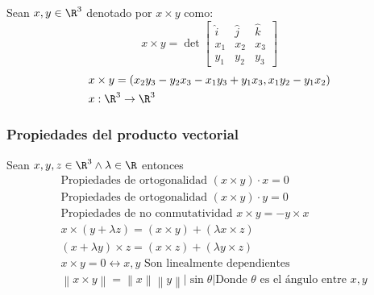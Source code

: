 \begin{definition}
	Sean $x,y \in \R^3$  denotado por $x\times y$ como:
	\begin{equation}
		x\times y=\det\begin{bmatrix}
			\hat{i} & \hat{j} & \hat{k} \\
			x_1     & x_2     & x_3     \\
			y_1     & y_2     & y_3
		\end{bmatrix}
	\end{equation}
	\begin{align}
		 & x\times y=\left( x_2y_3-y_2x_3-x_1y_3+y_1x_3,x_1y_2-y_1x_2 \right) \\
		 & x:\R^3\to \R^3
	\end{align}
\end{definition}

\subsubsection{Propiedades del producto vectorial}

Sean $x,y,z\in \R^3\land \lambda \in \R$ entonces
\begin{align}
	 & \text{Propiedades de ortogonalidad }(x\times y)\cdot x=0                                                                                                                \\
	 & \text{Propiedades de ortogonalidad }(x\times y)\cdot y=0                                                                                                                \\
	 & \text{Propiedades de no conmutatividad }x\times y=-y\times x                                                                                                            \\
	 & x\times (y+\lambda z)=(x\times y)+(\lambda x\times z)                                                                                                                   \\
	 & (x+\lambda y)\times z=(x\times z)+(\lambda y\times z)                                                                                                                   \\
	 & x\times y=0\longleftrightarrow x,y \text{ Son linealmente dependientes}                                                                                                 \\
	 & \left\lVert x\times y\right\rVert=\left\lVert x\right\rVert\left\lVert y\right\rVert \left\lvert \sin \theta \right\rvert  \text{Donde $\theta$ es el ángulo entre }x,y
\end{align}

